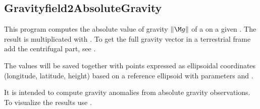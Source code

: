 \subsection{Gravityfield2AbsoluteGravity}\label{Gravityfield2AbsoluteGravity}
This program computes the absolute value of gravity $\left\lVert{\M g}\right\rVert$
of a  on a given .
The result is multiplicated with .
To get the full gravity vector in a terrestrial frame add
the centrifugal part, see .

The values will be saved together with points expressed as ellipsoidal coordinates (longitude, latitude, height)
based on a reference ellipsoid with parameters  and .

It is intended to compute gravity anomalies from absolute gravity observations.
To visualize the results use .


